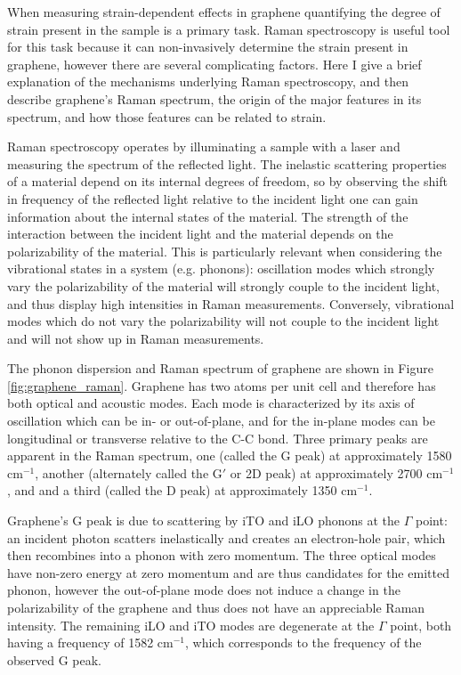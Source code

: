 \documentclass[edeposit,fullpage,draftthesis]{uiucthesis2009}
\begin{document}
        When measuring strain-dependent effects in graphene quantifying the degree of strain present in 
        the sample is a primary task. Raman spectroscopy is useful tool for this task because it can
        non-invasively determine the strain present in graphene, however there are several complicating factors.
        Here I give a brief explanation of the mechanisms underlying Raman spectroscopy, and then
        describe graphene's Raman spectrum, the origin of the major features in its spectrum,
        and how those features can be related to strain.
        
        Raman spectroscopy operates by illuminating a sample with a laser and measuring the spectrum
        of the reflected light. The inelastic scattering properties of a material depend on its
        internal degrees of freedom, so by 
        observing the shift in frequency of the reflected light relative to the incident light one can
        gain information about the internal states of the material. 
        The strength of the interaction between the incident light and the material depends on the polarizability
        of the material. This is particularly relevant when considering the vibrational states in 
        a system (e.g. phonons): oscillation modes which strongly vary the polarizability of the material
        will strongly couple to the incident light, and thus display high intensities in Raman measurements.
        Conversely, vibrational modes which do not vary the polarizability will not couple to the incident
        light and will not show up in Raman measurements.
        
        The phonon dispersion and Raman spectrum of graphene are shown in Figure \ref{fig:graphene_raman}. 
        Graphene has two atoms per unit cell and therefore has both optical and acoustic modes. Each mode
        is characterized by its axis of oscillation which can be in- or out-of-plane, and for the in-plane 
        modes can be longitudinal or transverse relative to the C-C bond.
        Three primary peaks are apparent in the Raman spectrum,
        one (called the G peak) at approximately 1580 cm$^{-1}$, 
        another (alternately called the G$'$ or 2D peak) at approximately 2700 cm$^{-1}$, and
        and a third (called the D peak) at approximately 1350 cm$^{-1}$. 
       
        Graphene's G peak is due to scattering by iTO and iLO phonons at the $\Gamma$ point: an incident photon
        scatters inelastically and creates an electron-hole pair, which then recombines into a phonon
        with zero momentum. The three optical modes have non-zero energy at zero momentum and are thus 
        candidates for the emitted phonon, however the out-of-plane mode does not induce a change in the 
        polarizability of the graphene and thus does not have an appreciable Raman intensity. The
        remaining iLO and iTO modes are degenerate at the $\Gamma$ point, both having a frequency of
        1582 cm$^{-1}$, which corresponds to the frequency of the observed G peak.
                   
\end{document}

